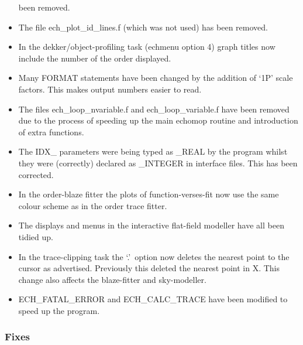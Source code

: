 \begin{itemize}
   been removed.
\item The file ech\_plot\_id\_lines.f (which was not used) has been removed.
\item In the dekker/object-profiling task (echmenu option 4) graph titles
   now include the number of the order displayed.
\item Many FORMAT statements have been changed by the addition of `1P'
   scale factors.  This makes output numbers easier to read.
\item The files ech\_loop\_nvariable.f and ech\_loop\_variable.f have been
   removed due to the process of speeding up the main {\sc echomop} routine
   and introduction of extra functions.
\item The IDX\_ parameters were being typed as \_REAL by the program whilst
   they were (correctly) declared as \_INTEGER in interface files.
   This has been corrected.
\item In the order-blaze fitter the plots of function-verses-fit now
   use the same colour scheme as in the order trace fitter.
\item The displays and menus in the interactive flat-field modeller have
   all been tidied up.
\item In the trace-clipping task the `.'\ option now deletes the nearest
   point to the cursor as advertised.  Previously this deleted the
   nearest point in X.  This change also affects the blaze-fitter and
   sky-modeller.
\item ECH\_FATAL\_ERROR and ECH\_CALC\_TRACE have been modified to speed up
   the program.
\end{itemize}

\subsubsection{Fixes}

